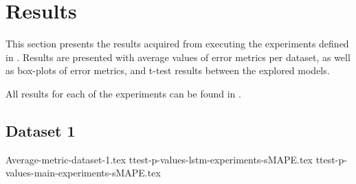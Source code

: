 \section{Results}
\label{section:discussion&results:experiment-results}

This section presents the results acquired from executing the experiments defined in .
Results are presented with average values of error metrics per dataset, as well as box-plots of error metrics,
and t-test results between the explored models.

All results for each of the experiments can be found in .

\subsection{Dataset 1}
{Average-metric-dataset-1.tex}
{ttest-p-values-lstm-experiments-sMAPE.tex}
{ttest-p-values-main-experiments-sMAPE.tex}

